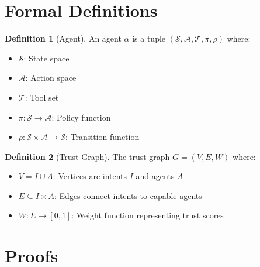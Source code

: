 \documentclass[11pt,a4paper]{article}
\theoremstyle{definition}
\newtheorem{definition}{Definition}[section]
\theoremstyle{remark}
\begin{document}

\appendix

\section{Formal Definitions}
\label{sec:formal-definitions}

\begin{definition}[Agent]
An agent $\alpha$ is a tuple $(\mathcal{S}, \mathcal{A}, \mathcal{T}, \pi, \rho)$ where:
\begin{itemize}
    \item $\mathcal{S}$: State space
    \item $\mathcal{A}$: Action space
    \item $\mathcal{T}$: Tool set
    \item $\pi: \mathcal{S} \rightarrow \mathcal{A}$: Policy function
    \item $\rho: \mathcal{S} \times \mathcal{A} \rightarrow \mathcal{S}$: Transition function
\end{itemize}
\end{definition}

\begin{definition}[Trust Graph]
The trust graph $G = (V, E, W)$ where:
\begin{itemize}
    \item $V = I \cup A$: Vertices are intents $I$ and agents $A$
    \item $E \subseteq I \times A$: Edges connect intents to capable agents
    \item $W: E \rightarrow [0,1]$: Weight function representing trust scores
\end{itemize}
\end{definition}

\section{Proofs}
\label{sec:proofs}
\end{document}
